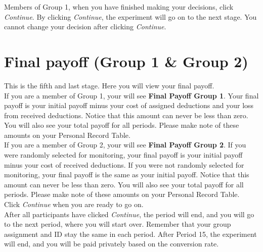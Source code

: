 \documentclass[12pt]{article}
\begin{document}
Members of Group 1, when you have finished making your decisions, click {\em Continue}.  By clicking {\em Continue}, the experiment will go on to the next stage.  You cannot change your decision after clicking {\em Continue}.

\newpage

\section{Final payoff (Group 1 \& Group 2)}

This is the fifth and last stage.  Here you will view your final payoff.\\

If you are a member of Group 1, your will see {\bf Final Payoff Group 1}.  Your final payoff is your initial payoff minus your cost of assigned deductions and your loss from received deductions.  Notice that this amount can never be less than zero.  You will also see your total payoff for all periods.  Please make note of these amounts on your Personal Record Table.\\

If you are a member of Group 2, your will see {\bf Final Payoff Group 2}.  If you were randomly selected for monitoring, your final payoff is your initial payoff minus your cost of received deductions. If you were not randomly selected for monitoring, your final payoff is the same as your initial payoff. Notice that this amount can never be less than zero.  You will also see your total payoff for all periods.  Please make note of these amounts on your Personal Record Table.\\
  
Click {\em Continue} when you are ready to go on.\\
 
After all participants have clicked {\em Continue}, the period will end, and you will go to the next period, where you will start over. Remember that your group assignment and ID stay the same in each period.  After Period 15, the experiment will end, and you will be paid privately based on the conversion rate.\\



\newpage

\end{document}
